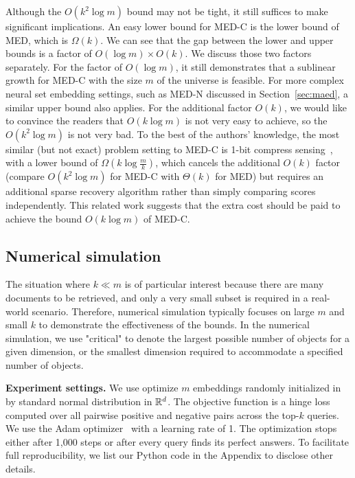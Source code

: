 Although the $O(k^2\log m)$ bound may not be tight, it still suffices to make significant implications. An easy lower bound for MED-C is the lower bound of MED, which is $\Omega(k)$. We can see that the gap between the lower and upper bounds is a factor of $O(\log m)\times O(k)$. We discuss those two factors separately. For the factor of $O(\log m)$, it still demonstrates that a sublinear growth for MED-C with the size $m$ of the universe is feasible. For more complex neural set embedding settings, such as MED-N discussed in Section~\ref{sec:maed}, a similar upper bound also applies. For the additional factor $O(k)$, we would like to convince the readers that $O(k\log m)$ is not very easy to achieve, so the $O(k^2 \log m)$ is not very bad. To the best of the authors' knowledge, the most similar (but not exact) problem setting to MED-C is 1-bit compress sensing~\citep{aksoylar2014information}, with a lower bound of $\Omega(k\log \frac{m}{k}) $, which cancels the additional $O(k)$ factor (compare $O(k^2\log m)$ for MED-C with $\Theta(k)$ for MED) but requires an additional sparse recovery algorithm rather than simply comparing scores independently. This related work suggests that the extra cost should be paid to achieve the bound $O(k\log m)$ of MED-C.


\subsection{Numerical simulation}

The situation where $k \ll m$ is of particular interest because there are many documents to be retrieved, and only a very small subset is required in a real-world scenario. Therefore, numerical simulation typically focuses on large $m$ and small $k$ to demonstrate the effectiveness of the bounds.
In the numerical simulation, we use "critical" to denote the largest possible number of objects for a given dimension, or the smallest dimension required to accommodate a specified number of objects.

\noindent\textbf{Experiment settings.} We use optimize $m$ embeddings randomly initialized in by standard normal distribution in $\mathbb{R}^d$. The objective function is a hinge loss computed over all pairwise positive and negative pairs across the top-$k$ queries. We use the Adam optimizer~\citep{kingma2014adam} with a learning rate of 1. The optimization stops either after 1,000 steps or after every query finds its perfect answers. To facilitate full reproducibility, we list our Python code in the Appendix to disclose other details.

